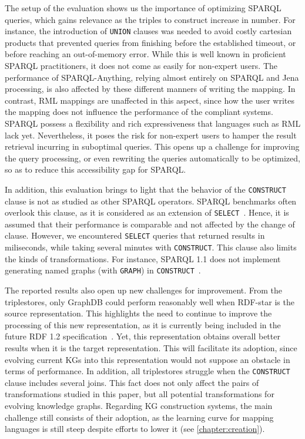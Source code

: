 The setup of the evaluation shows us the importance of optimizing SPARQL queries, which gains relevance as the triples to construct increase in number. For instance, the introduction of \texttt{UNION} clauses was needed to avoid costly cartesian products that prevented queries from finishing before the established timeout, or before reaching an out-of-memory error. While this is well known in proficient SPARQL practitioners, it does not come as easily for non-expert users. The performance of SPARQL-Anything, relying almost entirely on SPARQL and Jena processing, is also affected by these different manners of writing the mapping. In contrast, RML mappings are unaffected in this aspect, since how the user writes the mapping does not influence the performance of the compliant systems. SPARQL possess a flexibility and rich expressiveness that languages such as RML lack yet. Nevertheless, it poses the risk for non-expert users to hamper the result retrieval incurring in suboptimal queries. This opens up a challenge for improving the query processing, or even rewriting the queries automatically to be optimized, so as to reduce this accessibility gap for SPARQL.

In addition, this evaluation brings to light that the behavior of the \texttt{CONSTRUCT} clause is not as studied as other SPARQL operators. SPARQL benchmarks often overlook this clause, as it is considered as an extension of \texttt{SELECT}~\citep{schmidt2009sp}. Hence, it is assumed that their performance is comparable and not affected by the change of clause. However, we encountered \texttt{SELECT} queries that returned results in miliseconds, while taking several minutes with \texttt{CONSTRUCT}. 
This clause also limits the kinds of transformations. For instance, SPARQL 1.1 does not implement generating named graphs (with \texttt{GRAPH}) in \texttt{CONSTRUCT}~\citep{harris2013sparql}.


The reported results also open up new challenges for improvement. From the triplestores, only GraphDB could perform reasonably well when RDF-star is the source representation. This highlights the need to continue to improve the processing of this new representation, as it is currently being included in the future RDF 1.2 specification~\citep{hartig2023rdf}. Yet, this representation obtains overall better results when it is the target representation. This will facilitate its adoption, since evolving current KGs into this representation would not suppose an obstacle in terms of performance. 
In addition, all triplestores struggle when the \texttt{CONSTRUCT} clause includes several joins. This fact does not only affect the pairs of transformations studied in this paper, but all potential transformations for evolving knowledge graphs. Regarding KG construction systems, the main challenge still consists of their adoption, as the learning curve for mapping languages is still steep despite efforts to lower it (see \cref{chapter:creation}).
